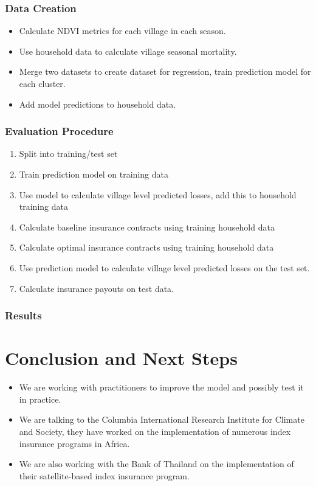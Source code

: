 \documentclass[11pt]{article}
\begin{document}
    \subsubsection{Data Creation}
      \begin{itemize}
          \item Calculate NDVI metrics for each village in each season.
          \item Use household data to calculate village seasonal mortality.
          \item Merge two datasets to create dataset for regression, train prediction model for each cluster. 
          \item Add model predictions to household data. 
      \end{itemize}

    \subsubsection{Evaluation Procedure}
        \begin{enumerate}
            \item Split into training/test set
            \item Train prediction model on training data
            \item Use model to calculate village level predicted losses, add this to household training data
            \item Calculate baseline insurance contracts using training household data
            \item Calculate optimal insurance contracts using training household data
            \item Use prediction model to calculate village level predicted losses on the test set. 
            \item Calculate insurance payouts on test data. 
        \end{enumerate}

    \subsubsection{Results}

      

\section{Conclusion and Next Steps}
    \begin{itemize}
        \item We are working with practitioners to improve the model and possibly test it in practice.
        \item We are talking to the Columbia International Research Institute for Climate and Society, they have worked on the implementation of numerous index insurance programs in Africa.   
        \item We are also working with the Bank of Thailand on the implementation of their satellite-based index insurance program. 
    \end{itemize}
\end{document}
